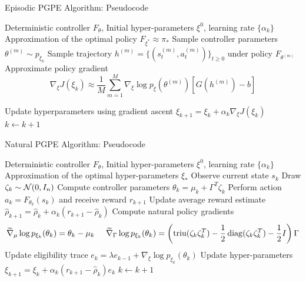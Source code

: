 \begin{frame}{Episodic PGPE Algorithm: Pseudocode}
	\begin{algorithmic}[1]
		\Require Deterministic controller $F_\theta$, Initial hyper-parameters $\xi^0$, learning rate $\{\alpha_k\}$
		\Ensure Approximation of the optimal policy $F_{\xi^*} \approx \pi_*$
		\Repeat
				\State Sample controller parameters $\theta^{(m)} \sim p_{\xi_k}$ 
				\State Sample trajectory $h^{(m)} = \{(s_t^{(m)}, a_t^{(m)})\}_{t \geq 0}$ under policy $F_{\theta^{(m)}}$
			\EndFor
			\State Approximate policy gradient 
		  		\begin{equation*}
		  		\nabla_\xi J(\xi_k) \approx \frac{1}{M} \sum^{M}_{m=1} \nabla_\xi \log p_\xi\left(\theta^{(m)}\right) \left[G\left(h^{(m)}\right)-b\right] 
		  		\end{equation*}
		  		
			\State Update hyperparameters using gradient ascent $\xi_{k+1} = \xi_k + \alpha_k \nabla_\xi J(\xi_k)$
			\State $k \leftarrow k + 1$
	\end{algorithmic}
\end{frame}

\begin{frame}{Natural PGPE Algorithm: Pseudocode}
	\begin{algorithmic}[1]
		\Require Deterministic controller $F_\theta$, Initial hyper-parameters $\xi^0$, learning rate $\{\alpha_k\}$
		\Ensure Approximation of the optimal hyper-parameters $\xi_*$
		\Repeat
			\State Observe current state $s_k$
			\State Draw $\zeta_k \sim \mathcal{N}(0, I_n)$
			\State Compute controller parameters $\theta_k = \mu_k + \Gamma^T \zeta_k$
			\State Perform action $a_k = F_{\theta_k}(s_k)$ and receive reward $r_{k+1}$
			\State Update average reward estimate $\widehat{\rho}_{k+1} = \widehat{\rho}_{k} + \alpha_k (r_{k+1} - \widehat{\rho}_{k})$
			\State Compute natural policy gradients
				\begin{equation*}
					\begin{split}
						\widetilde{\nabla}_\mu \log p_{\xi_k}(\theta_k) = \theta_k - \mu_k \;\;\;\;\;
						\widetilde{\nabla}_\Gamma \log p_{\xi_k}(\theta_k) = \left(\operatorname{triu}(\zeta_k \zeta_k^T) - \frac{1}{2} \operatorname{diag}(\zeta_k \zeta_k^T) - \frac{1}{2} I \right) \Gamma
					\end{split}
				\end{equation*}
			\State Update eligibility trace $e_{k} = \lambda e_{k-1} + \nabla_\xi \log p_{\xi_k}(\theta_k)$
			\State Update hyper-parameters $\xi_{k+1} = \xi_k + \alpha_k (r_{k+1} - \widehat{\rho}_{k}) e_k$
			\State $k \leftarrow k + 1$
	\end{algorithmic}
\end{frame}



